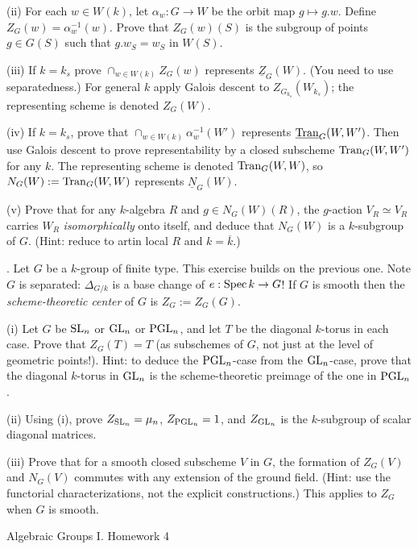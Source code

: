 \documentclass[10pt]{amsart}
\def\Spec{\mathop{\rm Spec}}
\begin{document}
(ii) For each $w \in W(k)$, let $\alpha_w:G \rightarrow W$ be the orbit map $g \mapsto g.w$.
Define $Z_G(w) = \alpha_w^{-1}(w)$. 
Prove that $Z_G(w)(S)$ is the subgroup of points $g \in G(S)$
such that $g.w_S = w_S$ in $W(S)$.

(iii) If $k = k_s$ prove $\cap_{w \in W(k)} Z_G(w)$ represents
$\underline{Z}_G(W)$.  (You need to use separatedness.) For general $k$ apply Galois descent 
to $Z_{G_{k_s}}(W_{k_s})$; the representing scheme is denoted $Z_G(W)$. 

(iv) If $k = k_s$, prove that 
$\cap_{w \in W(k)} \alpha_w^{-1}(W')$ represents $\underline{{\rm{Tran}}}_G(W,W')$.  Then use Galois
descent to prove representability by a closed subscheme ${\rm{Tran}}_G(W,W')$ for any $k$.
The representing scheme is denoted ${\rm{Tran}}_G(W,W)$,
so $N_G(W) := {\rm{Tran}}_G(W,W)$ represents $\underline{N}_G(W)$.  

(v) Prove that for any $k$-algebra $R$ and $g \in N_G(W)(R)$,
the $g$-action $V_R \simeq V_R$ carries $W_R$ {\em isomorphically} onto itself,
and deduce that $N_G(W)$ is a $k$-subgroup of $G$. (Hint: reduce to artin local $R$
and $k = \overline{k}$.) 

\medskip{}.  Let $G$ be a $k$-group of finite type.  This exercise builds on the previous one.  
Note $G$ is separated:  $\Delta_{G/k}$ is a base change of $e:\Spec k \rightarrow G$!
If $G$ is smooth then the {\em scheme-theoretic center} of $G$ is $Z_G := Z_G(G)$.

(i) Let $G$ be ${\rm{SL}}_n$ or ${\rm{GL}}_n$ or ${\rm{PGL}}_n$, and let
$T$ be the diagonal $k$-torus in each case.
Prove that $Z_G(T) = T$ (as subschemes of $G$, not just at the level of geometric points!). 
Hint: to deduce the ${\rm{PGL}}_n$-case from the ${\rm{GL}}_n$-case, prove that
the diagonal $k$-torus in ${\rm{GL}}_n$ is the scheme-theoretic preimage of the
one in ${\rm{PGL}}_n$. 

(ii) Using (i), prove $Z_{{\rm{SL}}_n} = \mu_n$, $Z_{{\rm{PGL}}_n} = 1$, and 
$Z_{{\rm{GL}}_n}$ is the $k$-subgroup of scalar diagonal matrices.

(iii) Prove that for a smooth closed subscheme $V$ in $G$, the formation of $Z_G(V)$ 
and $N_G(V)$ commutes with any extension of the ground field.  (Hint: use the functorial characterizations,
not the explicit constructions.)  This applies to $Z_G$ when $G$ is smooth.  

\newpage

\centerline{\sc Algebraic Groups I. Homework 4}
\medskip\medskip
\end{document}
